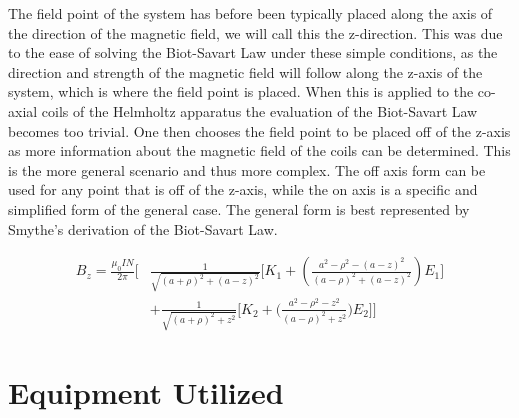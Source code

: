 \documentclass[a4paper]{article}
\begin{document}
The field point of the system has before been typically placed along
the axis of the direction of the magnetic field, we will call this the
z-direction. This was due to the ease of solving the Biot-Savart Law
under these simple conditions, as the direction and strength of the
magnetic field will follow along the z-axis of the system, which is
where the field point is placed. When this is applied to the co-axial
coils of the Helmholtz apparatus the evaluation of the Biot-Savart Law
becomes too trivial. One then chooses the field point to be placed off
of the z-axis as more information about the magnetic field of the
coils can be determined. This is the more general scenario and thus
more complex. The off axis form can be used for any point that is off
of the z-axis, while the on axis is a specific and simplified form of
the general case. The general form is best represented by Smythe's
derivation of the Biot-Savart Law.

\begin{align*} 
B_z = \frac{\mu_0IN}{2\pi}
\Big[&
    \frac{1}{\sqrt{(a+\rho)^2 + (a-z)^2}}
    \big[
        K_1 + \left(\frac{a^2 -\rho^2 - (a - z)^2}{(a-\rho)^2 + (a - z)^2} \right) E_1 
    \big]\\
    & + \frac{1}{\sqrt{(a + \rho)^2 + z^2}}
    \big[
        K_2 + \big(\frac{a^2 - \rho^2 - z^2}{(a - \rho)^2 + z^2}\big) E_2 
    \big] 
\Big]
\end{align*}

\section{Equipment Utilized}
\end{document}
